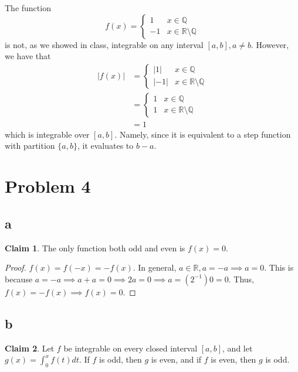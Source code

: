 \documentclass[12pt,letterpaper]{article}
\theoremstyle{definition}
\newtheorem*{claim}{Claim}
\newcommand{\R}{\mathbb{R}}
\newcommand{\Q}{\mathbb{Q}}
\begin{document}
The function
\[
  f(x) = \begin{cases}
    1 & x \in \Q \\
    -1 & x \in \R \setminus \Q
  \end{cases}
\]
is not, as we showed in class, integrable on any interval $[a,b], a \neq b$. However, we have that 
\begin{align*}
  |f(x)| &= \begin{cases}
    |1| & x \in \Q \\
    |-1| & x \in \R \setminus \Q
  \end{cases} \\
  &= \begin{cases}
    1 & x \in \Q \\
    1 & x \in \R \setminus \Q
  \end{cases} \\
  &= 1
\end{align*}
which is integrable over $[a,b]$. Namely, since it is equivalent to a step function with partition $\{a,b\}$, it evaluates to $b - a$.


\section*{Problem 4}

\subsection*{a}

\begin{claim}
  The only function both odd and even is $f(x) = 0$.
\end{claim}

\begin{proof}
  $f(x) = f(-x) = -f(x)$. In general, $a \in \R, a = -a \implies a = 0$. This is
  because $a = -a \implies a + a = 0 \implies 2a = 0 \implies a = (2^{-1})0 =
  0$. Thus, $f(x) = -f(x) \implies f(x) = 0$.
\end{proof}

\subsection*{b}

\begin{claim}
  Let $f$ be integrable on every closed interval $[a,b]$, and let $g(x) =
  \int_0^xf(t)dt$. If $f$ is odd, then $g$ is even, and if $f$ is even, then $g$
  is odd.
\end{claim}
\end{document}
